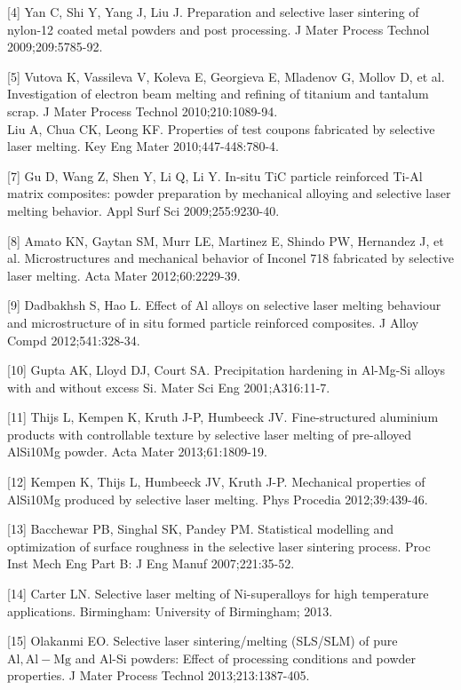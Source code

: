 \documentclass[10pt]{article}
\begin{document}
[4] Yan C, Shi Y, Yang J, Liu J. Preparation and selective laser sintering of nylon-12 coated metal powders and post processing. J Mater Process Technol 2009;209:5785-92.

[5] Vutova K, Vassileva V, Koleva E, Georgieva E, Mladenov G, Mollov D, et al. Investigation of electron beam melting and refining of titanium and tantalum scrap. J Mater Process Technol 2010;210:1089-94.\\
[6] Liu A, Chua CK, Leong KF. Properties of test coupons fabricated by selective laser melting. Key Eng Mater 2010;447-448:780-4.

[7] Gu D, Wang Z, Shen Y, Li Q, Li Y. In-situ TiC particle reinforced Ti-Al matrix composites: powder preparation by mechanical alloying and selective laser melting behavior. Appl Surf Sci 2009;255:9230-40.

[8] Amato KN, Gaytan SM, Murr LE, Martinez E, Shindo PW, Hernandez J, et al. Microstructures and mechanical behavior of Inconel 718 fabricated by selective laser melting. Acta Mater 2012;60:2229-39.

[9] Dadbakhsh S, Hao L. Effect of Al alloys on selective laser melting behaviour and microstructure of in situ formed particle reinforced composites. J Alloy Compd 2012;541:328-34.

[10] Gupta AK, Lloyd DJ, Court SA. Precipitation hardening in Al-Mg-Si alloys with and without excess Si. Mater Sci Eng 2001;A316:11-7.

[11] Thijs L, Kempen K, Kruth J-P, Humbeeck JV. Fine-structured aluminium products with controllable texture by selective laser melting of pre-alloyed AlSi10Mg powder. Acta Mater 2013;61:1809-19.

[12] Kempen K, Thijs L, Humbeeck JV, Kruth J-P. Mechanical properties of AlSi10Mg produced by selective laser melting. Phys Procedia 2012;39:439-46.

[13] Bacchewar PB, Singhal SK, Pandey PM. Statistical modelling and optimization of surface roughness in the selective laser sintering process. Proc Inst Mech Eng Part B: J Eng Manuf 2007;221:35-52.

[14] Carter LN. Selective laser melting of Ni-superalloys for high temperature applications. Birmingham: University of Birmingham; 2013.

[15] Olakanmi EO. Selective laser sintering/melting (SLS/SLM) of pure $\mathrm{Al}, \mathrm{Al}-\mathrm{Mg}$ and Al-Si powders: Effect of processing conditions and powder properties. J Mater Process Technol 2013;213:1387-405.
\end{document}

